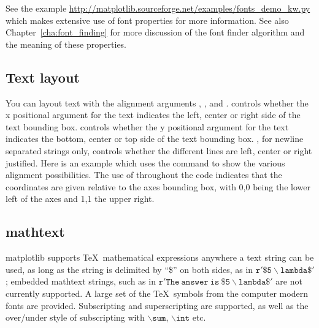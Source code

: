 \documentclass[twoside]{book}
\begin{document}
\noindent See the example
\url{http://matplotlib.sourceforge.net/examples/fonts_demo_kw.py}
which makes extensive use of font properties for more information.
See also Chapter~\ref{cha:font_finding} for more discussion of the
font finder algorithm and the meaning of these properties.

\subsection{Text layout}
\label{sec:text_layout}

You can layout text with the alignment arguments
, , and
.   controls whether
the x positional argument for the text indicates the left, center or
right side of the text bounding box.  controls
whether the y positional argument for the text indicates the bottom,
center or top side of the text bounding box.  ,
for newline separated strings only, controls whether the different
lines are left, center or right justified.  Here is an example which
uses the  command to show the various alignment
possibilities.  The use of  throughout
the code indicates that the coordinates are given relative to the axes
bounding box, with 0,0 being the lower left of the axes and 1,1 the
upper right.







\subsection{mathtext}
\label{sec:mathtext}

matplotlib supports \TeX\ mathematical expressions anywhere a text
string can be used, as long as the string is delimited by ``\$'' on
both sides, as in $\mathtt{r'\$5\backslash lambda\$'}$; embedded %
mathtext strings, such as in $\mathtt{r'The\ answer\ is\ \$5\backslash 
  lambda\$'}$ are not currently supported. A large set of the \TeX\ 
symbols from the computer modern fonts are provided.  Subscripting and
superscripting are supported, as well as the over/under style of
subscripting with $\mathtt{\backslash sum}$, $\mathtt{\backslash int}$
etc.
\end{document}

